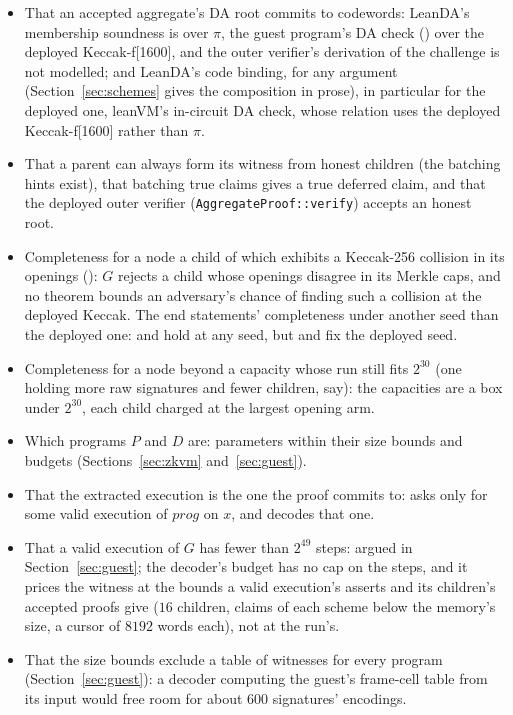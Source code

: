 \documentclass[11pt]{article}
\begin{document}
\begin{itemize}
\item That an accepted aggregate's DA root commits to codewords: LeanDA's membership soundness is over $\pi$, the guest
program's DA check () over the deployed Keccak-f[1600], and the outer verifier's derivation of the challenge is not modelled; and LeanDA's code binding, for any argument (Section~\ref{sec:schemes} gives the composition in prose), in particular for the deployed one, leanVM's in-circuit DA check, whose relation uses the deployed Keccak-f[1600] rather than $\pi$.
\item That a parent can always form its witness from honest children (the batching hints exist),
that batching true claims gives a true deferred claim, and that the deployed outer verifier
(\texttt{AggregateProof::verify}) accepts an honest root.
\item Completeness for a node a child of which exhibits a Keccak-256 collision in its openings (): $G$ rejects a child whose openings disagree in its Merkle caps, and no theorem bounds an adversary's chance of finding such a collision at the deployed Keccak. The end statements' completeness under another seed than the deployed one:  and  hold at any seed, but  and  fix the deployed seed.
\item Completeness for a node beyond a capacity whose run still fits $2^{30}$ (one holding more raw signatures and fewer children, say): the capacities are a box under $2^{30}$, each child charged at the largest opening arm.
\item Which programs $P$ and $D$ are: parameters within their size bounds and budgets (Sections~\ref{sec:zkvm} and~\ref{sec:guest}).
\item That the extracted execution is the one the proof commits to: 
asks only for some valid execution of $\mathit{prog}$ on $x$, and  decodes that one.
\item That a valid execution of $G$ has fewer than $2^{49}$ steps: argued in Section~\ref{sec:guest}; the
decoder's budget has no cap on the steps, and it prices the witness at the bounds a valid
execution's asserts and its children's accepted proofs give ($16$ children, claims of each scheme
below the memory's size, a cursor of $8192$ words each), not at the run's.
\item That the size bounds exclude a table of witnesses for every program (Section~\ref{sec:guest}): a decoder computing the guest's frame-cell table from its input would free room for about $600$ signatures' encodings.

\end{itemize}
\end{document}
